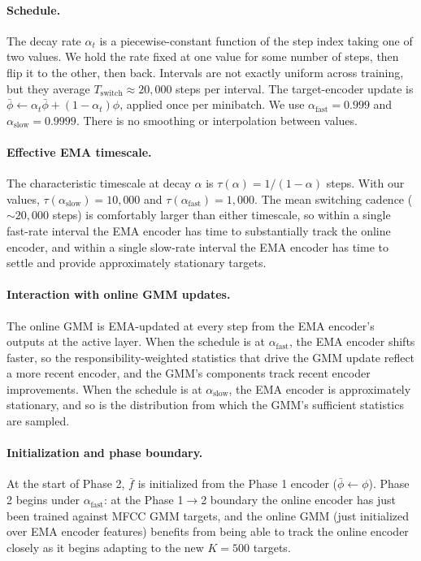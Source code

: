 \documentclass[9pt,twocolumn]{article}
\theoremstyle{plain}
\theoremstyle{definition}
\theoremstyle{remark}
\begin{document}
\paragraph{Schedule.} The decay rate $\alpha_t$ is a piecewise-constant function of the step index taking one of two values. We hold the rate fixed at one value for some number of steps, then flip it to the other, then back. Intervals are not exactly uniform across training, but they average $T_{\text{switch}} \approx 20{,}000$ steps per interval. The target-encoder update is $\bar{\phi} \leftarrow \alpha_t \bar{\phi} + (1-\alpha_t)\phi$, applied once per minibatch. We use $\alpha_{\text{fast}} = 0.999$ and $\alpha_{\text{slow}} = 0.9999$. There is no smoothing or interpolation between values.

\paragraph{Effective EMA timescale.} The characteristic timescale at decay $\alpha$ is $\tau(\alpha) = 1/(1-\alpha)$ steps. With our values, $\tau(\alpha_{\text{slow}}) = 10{,}000$ and $\tau(\alpha_{\text{fast}}) = 1{,}000$. The mean switching cadence ($\sim 20{,}000$ steps) is comfortably larger than either timescale, so within a single fast-rate interval the EMA encoder has time to substantially track the online encoder, and within a single slow-rate interval the EMA encoder has time to settle and provide approximately stationary targets.

\paragraph{Interaction with online GMM updates.} The online GMM is EMA-updated at every step from the EMA encoder's outputs at the active layer. When the schedule is at $\alpha_{\text{fast}}$, the EMA encoder shifts faster, so the responsibility-weighted statistics that drive the GMM update reflect a more recent encoder, and the GMM's components track recent encoder improvements. When the schedule is at $\alpha_{\text{slow}}$, the EMA encoder is approximately stationary, and so is the distribution from which the GMM's sufficient statistics are sampled.

\paragraph{Initialization and phase boundary.} At the start of Phase 2, $\bar{f}$ is initialized from the Phase 1 encoder ($\bar{\phi} \leftarrow \phi$). Phase 2 begins under $\alpha_{\text{fast}}$: at the Phase 1$\to$2 boundary the online encoder has just been trained against MFCC GMM targets, and the online GMM (just initialized over EMA encoder features) benefits from being able to track the online encoder closely as it begins adapting to the new $K\!=\!500$ targets.
\end{document}

